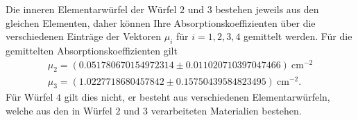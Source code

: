 \noindent Die inneren Elementarwürfel der Würfel $2$ und $3$ bestehen jeweils
aus den gleichen Elementen, daher können Ihre Absorptionskoeffizienten über die
verschiedenen Einträge der Vektoren $\mu_i$ für $i = 1, 2, 3, 4$ gemittelt
werden. Für die gemittelten Absorptionskoeffizienten gilt
\begin{align}
  \mu_2 = (0.051780670154972314  \pm  0.011020710397047466) \: \si{\centi\metre^{-2}}\\
  \mu_3 = (1.0227718680457842  \pm  0.15750439584823495) \: \si{\centi\metre^{-2}}.
\end{align}
\noindent Für Würfel $4$ gilt dies nicht, er besteht aus verschiedenen
Elementarwürfeln, welche aus den in Würfel $2$ und $3$ verarbeiteten Materialien
bestehen.

